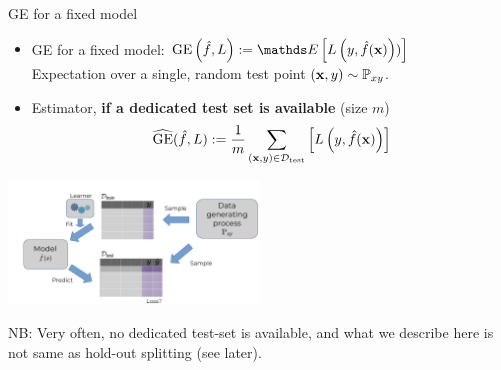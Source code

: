 \documentclass[11pt,compress,t,notes=noshow, xcolor=table]{beamer}
\begin{document}
\begin{vbframe}{GE for a fixed model}
\begin{itemize}
  \item GE for a fixed model: $\GEfL := \E \left[ \Lyfhx) \right]$\\
      Expectation over a single, random test point $(\mathbf{x}, y) \sim \mathbb{P}_{xy}$.
  \item Estimator, \textbf{if a dedicated test set is available} (size $m$) 
    $$\widehat{\mathrm{GE}}(\hat{f}, L) := \frac{1}{m}\sum_{(\mathbf{x}, y) \in \mathcal{D}_{\text{test}}} \left[ L\left(y, \hat{f}(\mathbf{x})\right) \right]$$
    
  
\end{itemize}

\begin{center}
\includegraphics[trim = 0 0 0 30, clip, width=0.5\textwidth]
{figure_man/evaluation-intro-ge.pdf}
\end{center}
  
\vfill

NB: Very often, no dedicated test-set is available, and what we describe here is not same
as hold-out splitting (see later).

\end{vbframe}
\end{document}
